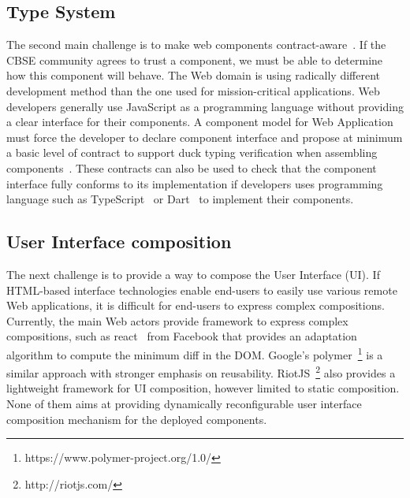
\subsection{Type System}
The second main challenge is to make web components contract-aware~\cite{beugnard1999making}. If the CBSE community agrees to trust a component, we must be able to determine how this component will behave. The Web domain is using radically different development method than the one used for mission-critical applications. Web developers generally use JavaScript as a programming language without providing a clear interface for their components. A component model for Web Application must force the developer to declare component interface and propose at minimum a basic level of contract to support duck typing verification when assembling components~\cite{beugnard1999making}. These contracts can also be used to check that the component interface fully conforms to its implementation if developers uses programming language such as TypeScript~\cite{rastogi2015safe} or Dart~\cite{dhiman2012google} to implement their components. 

\subsection{User Interface composition}
The next challenge is to provide a way to compose the User Interface (UI). If HTML-based interface technologies enable end-users to easily use various remote Web applications, it is difficult for end-users to express complex compositions. Currently, the main Web actors provide framework to express complex compositions, such as react~\cite{fedosejev2015react} from Facebook that provides an adaptation algorithm to compute the minimum diff in the DOM. Google's polymer~\footnote{https://www.polymer-project.org/1.0/} is a similar approach with stronger emphasis on reusability. RiotJS~\footnote{http://riotjs.com/} also provides a lightweight framework for UI composition, however limited to static composition.
None of them aims at providing dynamically reconfigurable user interface composition mechanism for the deployed components.

